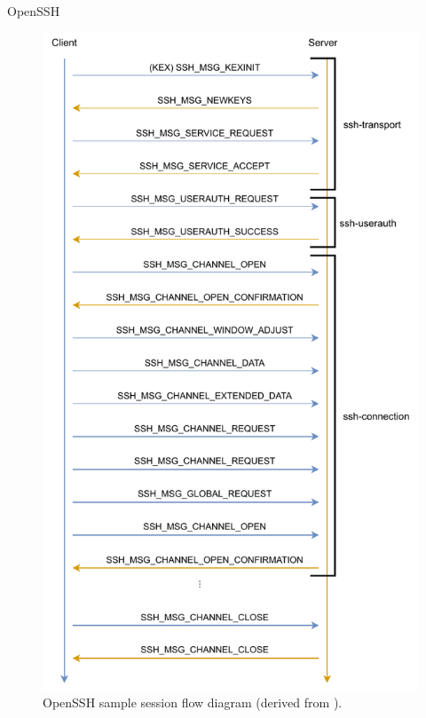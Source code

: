 \begin{frame}{OpenSSH}
    \begin{figure}
        \centering
        \includegraphics[width=0.35\columnwidth]{img/ssh-flow-diagram.pdf}
        \caption[OpenSSH sample session flow diagram]{
            OpenSSH sample session flow diagram (derived from \cite{openssh2007}).
        }
    \end{figure}
\end{frame}
